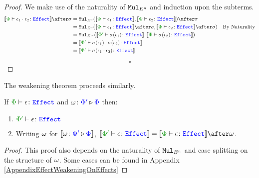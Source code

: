 \documentclass{Report}
\begin{document}
\begin{framed}
\begin{proof}
    
    \case{\ecompose}
    
    We make use of the naturality of $\texttt{Mul}_{E^n}$ and induction upon the subterms.
    \begin{align*}
        \deno{\typerelation{\P}{\e_1\dot\e_2}{\effect}} \after\si &=
        \Mul_{E^n}(\deno{\typerelation{\P}{\e_1}{\effect}}, \deno{\typerelation{\P}{\e_2}{\effect}})\after \si \\
        & = \Mul_{E^n}(\deno{\typerelation{\P}{\e_1}{\effect}}\after \si, \deno{\typerelation{\P}{\e_2}{\effect}}\after \si)\qt{By Naturality}\\
        & = \Mul_{E^m}(\deno{\typerelation{\P'}{\si(\e_1)}{\effect}}, \deno{\typerelation{\P}{\si(\e_2)}{\effect}})\\
        & = \deno{\typerelation{\P'}{\si(\e_1)\dot\si(\e_2)}{\effect}}\\
        & = \deno{\typerelation{\P'}{\si(\e_1\dot\e_2)}{\effect}}\\
    \end{align*}
    
    $$\square$$
    \end{proof}
\end{framed}

The weakening theorem proceeds similarly.

\begin{framed}
    \begin{theorem}\label{EffectWeakeningOnEffects}
       If $\wellformedeffect{\P}{\e}$ and $\omega \colon {\color{blue}\Phi'} \triangleright {\color {blue} \Phi}$ then: 
       \begin{enumerate}[label=\roman*.]
           \item $\wellformedeffect{\P'}{\e}$
           \item Writing $\omega$ for ${\bf [\![}\omega \colon {\color{blue}\Phi'} \triangleright {\color {blue} \Phi}{\bf ]\!]}$,  $\deno{\wellformedeffect{\P'}{\e}} = \deno{\wellformedeffect{\P}{\e}}\after\w$.
       \end{enumerate}    
    \end{theorem}
    
    \begin{proof}
        This proof also depends on the naturality of $\texttt{Mul}_{E^n}$ and case splitting on the structure of $\omega$.  Some cases can be found in Appendix \ref{AppendixEffectWeakeningOnEffects}
    \end{proof}
\end{framed}
\end{document}
